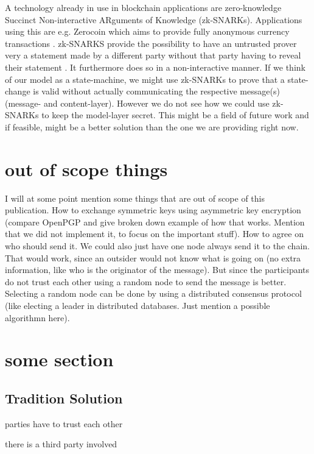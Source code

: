 \documentclass[runningheads]{llncs}
\begin{document}
A technology already in use in blockchain applications are zero-knowledge Succinct Non-interactive ARguments of Knowledge (zk-SNARKs). Applications using this are e.g. Zerocoin which aims to provide fully anonymous currency transactions \cite{miers2013zerocoin}. zk-SNARKS provide the possibility to have an untrusted prover very a statement made by a different party without that party having to reveal their statement \cite{ben2013snarks}. It furthermore does so in a non-interactive manner. If we think of our model as a state-machine, we might use zk-SNARKs to prove that a state-change is valid without actually communicating the respective message(s) (message- and content-layer). However we do not see how we could use zk-SNARKs to keep the model-layer secret. This might be a field of future work and if feasible, might be a better solution than the one we are providing right now. 




\section{out of scope things}
I will at some point mention some things that are out of scope of this publication. How to exchange symmetric keys using asymmetric key encryption (compare OpenPGP and give broken down example of how that works. Mention that we did not implement it, to focus on the important stuff). How to agree on who should send it. We could also just have one node always send it to the chain. That would work, since an outsider would not know what is going on (no extra information, like who is the originator of the message). But since the participants do not trust each other using a random node to send the message is better. Selecting a random node can be done by using a distributed consensus protocol (like electing a leader in distributed databases. Just mention a possible algorithmn here).   



\section{some section}


\subsection{Tradition Solution}
parties have to trust each other 

there is a third party involved
\end{document}
